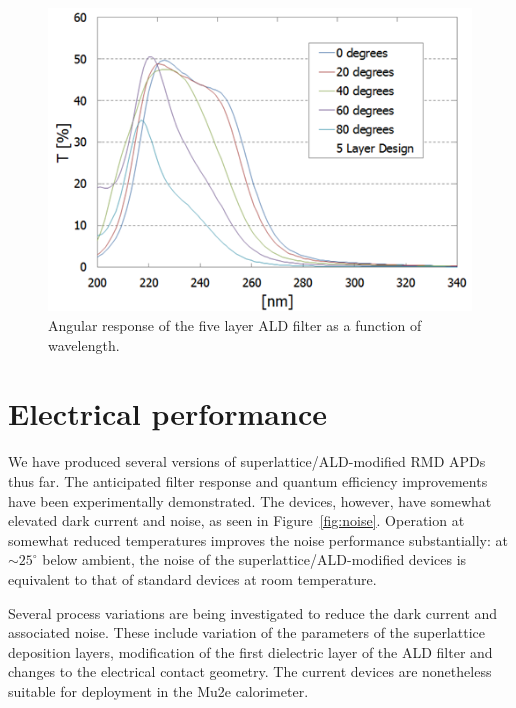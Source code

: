 \begin{figure}[h!]
\centering
\includegraphics[width=0.9\linewidth]{Figures/angle.png}
\caption{Angular response of the five layer ALD filter as a function of wavelength.}
\label{fig:angle}
\end{figure}


\section{Electrical performance}

We have produced several versions of superlattice/ALD-modified RMD APDs thus far. The anticipated filter response and quantum efficiency improvements have been experimentally demonstrated. The devices, however, have somewhat elevated dark current and noise, as seen in Figure~\ref{fig:noise}. Operation at somewhat reduced temperatures improves the noise performance substantially: at $\sim\!\! 25^\circ$ below ambient, the noise of the superlattice/ALD-modified devices is equivalent to that of standard devices at room temperature.

Several process variations are being investigated to reduce the dark current and associated noise. These include variation of the parameters of the superlattice deposition layers, modification of the first dielectric layer of the ALD filter and changes to the electrical contact geometry. The current devices are nonetheless suitable for deployment in the Mu2e calorimeter.

